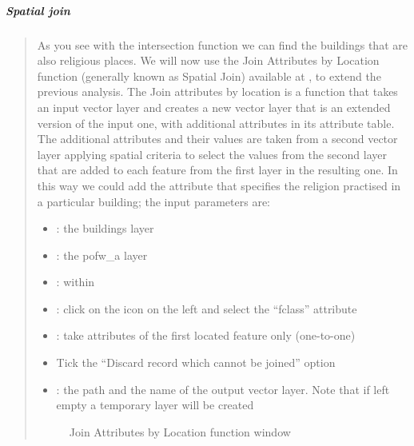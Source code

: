 \documentclass[letterpaper,10pt,english]{sphinxmanual}
\let\sphinxpxdimen\pdfpxdimen\else\newdimen\sphinxpxdimen
\begin{document}
\subparagraph{Spatial join}
\label{\detokenize{vector/overlay:spatial-join}}\begin{quote}

As you see with the intersection function we can find the buildings that are also religious places. We will now use the
Join Attributes by Location function (generally known as Spatial Join) available at ,
to extend the previous analysis. The Join attributes by location is a function that takes an input vector layer and creates a new vector
layer that is an extended version of the input one, with additional attributes in its attribute table. The additional attributes and their
values are taken from a second vector layer applying spatial criteria to select the values from the second layer that are added to each
feature from the first layer in the resulting one. In this way we could add the attribute that specifies the religion practised in a
particular building; the input parameters are:
\begin{itemize}
\item {} 
: the buildings layer

\item {} 
: the pofw\_a layer

\item {} 
: within

\item {} 
: click on the icon on the left and select the “fclass” attribute

\item {} 
: take attributes of the first located feature only (one-to-one)

\item {} 
Tick the “Discard record which cannot be joined” option

\item {} 
: the path and the name of the output vector layer. Note that if left empty a temporary layer will be created

\end{itemize}

\begin{figure}[htbp]
\centering
\capstart

\noindent\sphinxincludegraphics[width=800\sphinxpxdimen]{{3.3.6_spatial_join}.PNG}
\caption{Join Attributes by Location function window}\label{\detokenize{vector/overlay:id8}}\end{figure}


\end{quote}
\end{document}
